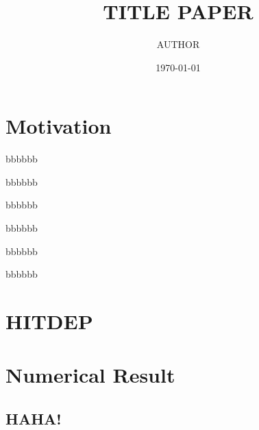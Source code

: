 \documentclass{amsart}[11pt]
\title{TITLE PAPER}
\author{AUTHOR}
\date{\today}
\begin{document}
\begin{abstract}
\end{abstract}
\maketitle



\section{Motivation}
\lipsum
\begin{theorem}
\end{theorem}

\begin{corollary}
\end{corollary}

\begin{proposition}
bbbbbb
\end{proposition}

\begin{conjecture}
bbbbbb
\end{conjecture}

\begin{lemma}
bbbbbb
\end{lemma}

\begin{definition}
bbbbbb
\end{definition}

\begin{remark}
bbbbbb
\end{remark}

\begin{assumption}
bbbbbb
\end{assumption}




\section{HITDEP}
\lipsum

\section{Numerical Result}
\subsection{HAHA!}
\lipsum


\printbibliography
\nocite{*}
\end{document}
